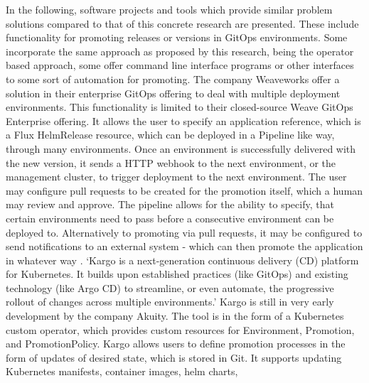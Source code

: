 In the following,
software projects and tools
which provide similar problem solutions compared to that of
this concrete research are presented.
These include functionality for promoting releases or versions
in GitOps environments.
Some incorporate the same approach as proposed by this research,
being the operator based approach,
some offer command line interface programs or other interfaces
to some sort of automation for promoting.
%
%
The company Weaveworks
offer a solution in their enterprise GitOps offering
to deal with multiple deployment environments.
This functionality is limited to their closed-source Weave GitOps Enterprise offering.
It allows the user to specify an application reference,
which is a Flux HelmRelease resource,
which can be deployed in a Pipeline like way,
through many environments.
Once an environment is successfully delivered with the new version,
it sends a HTTP webhook to the next environment, or the management cluster,
to trigger deployment to the next environment.
The user may configure pull requests to be created for the promotion itself,
which a human may review and approve.
The pipeline allows for the ability to specify, that certain environments need
to pass before a consecutive environment can be deployed to.
Alternatively to promoting via pull requests,
it may be configured to send notifications
to an external system -
which can then promote the application in whatever way
\autocite{weaveGitOpsPipelines}.
%
%
%
\enquote*{Kargo is a next-generation continuous delivery (CD) platform for Kubernetes. It builds upon established practices (like GitOps) and existing technology (like Argo CD) to streamline, or even automate, the progressive rollout of changes across multiple environments.}
\autocite{kargoAkuityWebsite}
Kargo is still in very early development by the company Akuity.
The tool is in the form of a Kubernetes custom operator, which provides custom resources
for Environment, Promotion, and PromotionPolicy.
Kargo allows users to define promotion processes in the form of updates of desired state,
which is stored in Git. It supports updating Kubernetes manifests, container images, helm charts,
